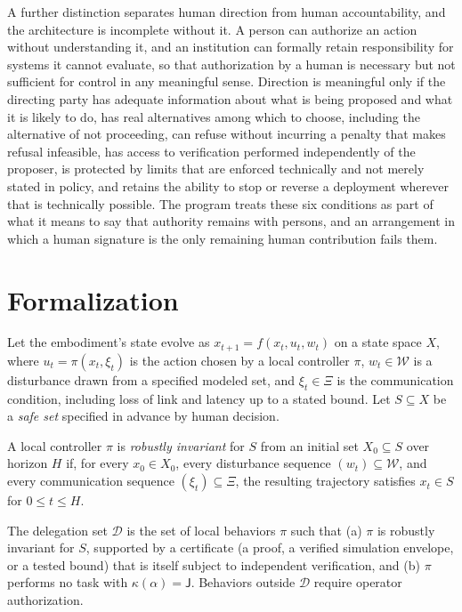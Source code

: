 A further distinction separates human direction from human accountability, and the architecture is incomplete without it. A person can authorize an action without understanding it, and an institution can formally retain responsibility for systems it cannot evaluate, so that authorization by a human is necessary but not sufficient for control in any meaningful sense. Direction is meaningful only if the directing party has adequate information about what is being proposed and what it is likely to do, has real alternatives among which to choose, including the alternative of not proceeding, can refuse without incurring a penalty that makes refusal infeasible, has access to verification performed independently of the proposer, is protected by limits that are enforced technically and not merely stated in policy, and retains the ability to stop or reverse a deployment wherever that is technically possible. The program treats these six conditions as part of what it means to say that authority remains with persons, and an arrangement in which a human signature is the only remaining human contribution fails them.

\section*{Formalization}

Let the embodiment's state evolve as $x_{t+1}=f(x_t,u_t,w_t)$ on a state space $X$, where $u_t=\pi(x_t,\xi_t)$ is the action chosen by a local controller $\pi$, $w_t\in\mathcal{W}$ is a disturbance drawn from a specified modeled set, and $\xi_t\in\Xi$ is the communication condition, including loss of link and latency up to a stated bound. Let $S\subseteq X$ be a \emph{safe set} specified in advance by human decision.

\begin{definition}
A local controller $\pi$ is \emph{robustly invariant} for $S$ from an initial set $X_0\subseteq S$ over horizon $H$ if, for every $x_0\in X_0$, every disturbance sequence $(w_t)\subseteq\mathcal{W}$, and every communication sequence $(\xi_t)\subseteq\Xi$, the resulting trajectory satisfies $x_t\in S$ for $0\le t\le H$.
\end{definition}

\begin{definition}
The delegation set $\mathcal{D}$ is the set of local behaviors $\pi$ such that (a) $\pi$ is robustly invariant for $S$, supported by a certificate (a proof, a verified simulation envelope, or a tested bound) that is itself subject to independent verification, and (b) $\pi$ performs no task with $\kappa(\alpha)=\mathsf{J}$. Behaviors outside $\mathcal{D}$ require operator authorization.
\end{definition}

